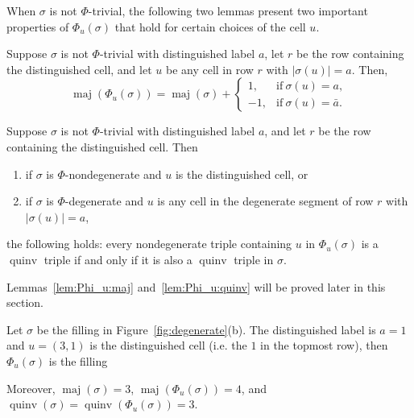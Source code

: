 \documentclass[ALCO,Unicode]{cedram}
\DeclareMathOperator{\maj}{maj}
\DeclareMathOperator{\quinv}{quinv}
\newcommand\cell[3]{
\def\i{#1} \def\j{#2} \def\entry{#3}

\draw (\j-1,-\i)--(\j,-\i)--(\j,-\i+1)--(\j-1,-\i+1)--(\j-1,-\i);
\node at (\j-.5,-\i+.5) {\entry};
}
\begin{document}
When $\sigma$ is not $\Phi$-trivial, the following two lemmas present two important properties of $\Phi_u(\sigma)$ that hold for certain choices of the cell $u$.

\begin{lemma}\label{lem:Phi_u:maj}
Suppose $\sigma$ is not $\Phi$-trivial with distinguished label $a$, let $r$ be the row containing the distinguished cell, and let $u$ be any cell in row $r$ with $|\sigma(u)|=a$. 
Then, 
\begin{equation}
\maj(\Phi_u(\sigma))=\maj(\sigma)+\begin{cases}1,&\mbox{if}\ \sigma(u)=a,\\-1,&\mbox{if}\ \sigma(u)=\bar{a}.\end{cases}\end{equation}
\end{lemma}

\begin{lemma}\label{lem:Phi_u:quinv}
Suppose $\sigma$ is not $\Phi$-trivial with distinguished label $a$, and let $r$ be the row containing the distinguished cell. Then
\begin{enumerate}
\item if $\sigma$ is $\Phi$-nondegenerate and $u$ is the distinguished cell, or
\item if $\sigma$ is $\Phi$-degenerate and $u$ is any cell in the degenerate segment of row $r$ with $|\sigma(u)|=a$, 
\end{enumerate}
the following holds: every nondegenerate triple containing $u$ in $\Phi_u(\sigma)$  is a $\quinv$ triple if and only if it is also a $\quinv$ triple in $\sigma$.
\end{lemma}

Lemmas~\ref{lem:Phi_u:maj} and~\ref{lem:Phi_u:quinv} will be proved later in this section.

\begin{example}
Let $\sigma$ be the filling in Figure~\ref{fig:degenerate}(b). The distinguished label is $a=1$ and $u=(3,1)$ is the distinguished cell (i.e. the $1$ in the topmost row), then $\Phi_u(\sigma)$ is the filling

\begin{center}
\end{center}
Moreover, $\maj(\sigma)=3$, $\maj(\Phi_u(\sigma))=4$, and $\quinv(\sigma)=\quinv(\Phi_u(\sigma))=3$.
\end{example}
\end{document}
